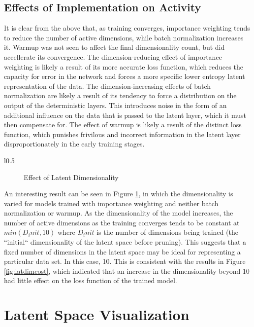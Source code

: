 \documentclass{article} %
\begin{document}
\subsection{Effects of Implementation on Activity}
It is clear from the above that, as training converges, importance weighting tends to reduce the number of active dimensions, while batch normalization increases it. Warmup was not seen to affect the final dimensionality count, but did accellerate its convergence. The dimension-reducing effect of importance weighting is likely a result of its more accurate loss function, which reduces the capacity for error in the network and forces a more specific lower entropy latent representation of the data. The dimension-increasing effects of batch normalization are likely a result of its tendency to force a distribution on the output of the deterministic layers. This introduces noise in the form of an additional influence on the data that is passed to the latent layer, which it must then compensate for. The effect of warmup is likely a result of the distinct loss function, which punishes frivilous and incorrect information in the latent layer disproportionately in the early training stages.
\begin{wrapfigure}{l}{0.5\textwidth}
  \begin{subfigure}[b]{0.45\textwidth}
    \resizebox{\linewidth}{!}{}
    \caption{Effect of Latent Dimensionality}
    \label{fig:latdimlat}
  \end{subfigure}
\end{wrapfigure}
\par An interesting result can be seen in Figure \ref{fig:latdimlat}, in which the dimensionality is varied for models trained with importance weighting and neither batch normalization or warmup. As the dimensionality of the model increases, the number of active dimensions as the training converges tends to be constant at $min(D_init,10)$ where $D_init$ is the number of dimensions being trained (the ``initial`` dimensionality of the latent space before pruning). This suggests that a fixed number of dimensions in the latent space may be ideal for representing a particular data set. In this case, 10. This is consistent with the results in Figure \ref{fig:latdimcost}, which indicated that an increase in the dimensionality beyond 10 had little effect on the loss function of the trained model.
\section{Latent Space Visualization}
\end{document}
